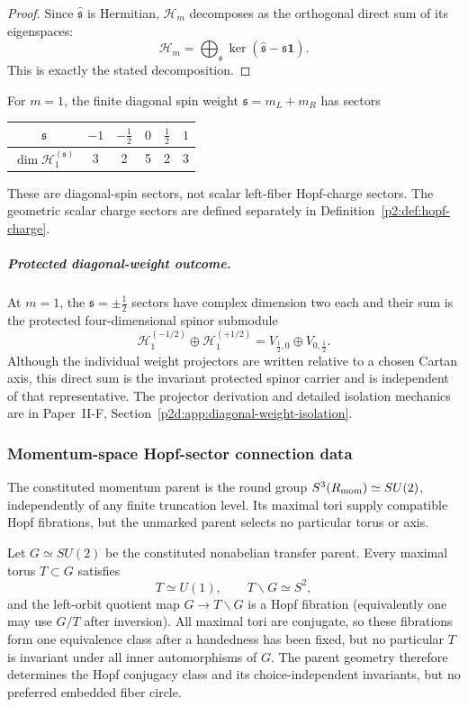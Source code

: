\documentclass[12pt,a4paper]{article}
\begin{document}
\begin{proof}
Since \(\hat{\mathfrak s}\) is Hermitian, \(\mathcal H_m\) decomposes as the orthogonal direct sum of its eigenspaces:
\[
\mathcal H_m=\bigoplus_{\mathfrak s}\ker(\hat{\mathfrak s}-\mathfrak s\mathbf 1).
\]
This is exactly the stated decomposition.
\end{proof}

For \(m=1\), the finite diagonal spin weight \(\mathfrak s=m_L+m_R\) has sectors
\begin{center}
\begin{tabular}{|c|c|c|c|c|c|}
\hline
\(\mathfrak s\) & \(-1\) & \(-\frac12\) & \(0\) & \(\frac12\) & \(1\) \\
\hline
\(\dim \mathcal H_1^{(\mathfrak s)}\) & 3 & 2 & 5 & 2 & 3 \\
\hline
\end{tabular}
\end{center}
These are diagonal-spin sectors, not scalar left-fiber Hopf-charge
sectors.  The geometric scalar charge sectors are defined separately in
Definition~\ref{p2:def:hopf-charge}.

\subparagraph{Protected diagonal-weight outcome.}
At \(m=1\), the \(\mathfrak s=\pm\tfrac12\) sectors have complex
dimension two each and their sum is the protected four-dimensional spinor
submodule
\[
 \boxed{
 \mathcal H_1^{(-1/2)}\oplus\mathcal H_1^{(+1/2)}
 =V_{\frac12,0}\oplus V_{0,\frac12}.}
\]
Although the individual weight projectors are written relative to a chosen
Cartan axis, this direct sum is the invariant protected spinor carrier and is
independent of that representative.  The projector derivation and detailed
isolation mechanics are in
Paper~II-F, Section~\ref{p2d:app:diagonal-weight-isolation}.

\subsubsection{Momentum-space Hopf-sector connection data}
\label{p2:sec:momentum-hopfions}

The constituted momentum parent is the round group
\(S^3(R_{\mathrm{mom}})\simeq SU(2)\), independently of any finite truncation level.
Its maximal tori supply compatible Hopf fibrations, but the unmarked parent
selects no particular torus or axis.

\begin{proposition}
\label{p2:prop:hopf-class-existence-nonselection}
Let \(G\simeq SU(2)\) be the constituted nonabelian transfer parent.  Every
maximal torus \(T\subset G\) satisfies
\[
        T\simeq U(1),
        \qquad
        T\backslash G\simeq S^2,
\]
and the left-orbit quotient map \(G\to T\backslash G\) is a Hopf fibration
(equivalently one may use \(G/T\) after inversion).  All maximal tori are
conjugate, so these fibrations form one equivalence class after a handedness
has been fixed, but no particular \(T\) is invariant under all inner
automorphisms of \(G\).  The parent geometry therefore determines the Hopf
conjugacy class and its choice-independent invariants, but no preferred embedded
fiber circle.
\end{proposition}
\end{document}
